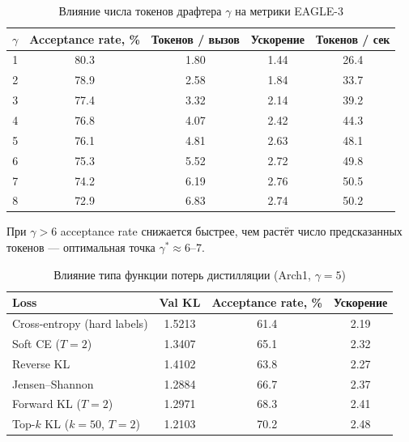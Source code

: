 \documentclass[12pt, a4paper]{article}
\begin{document}
\begin{table}[h]
\centering
\caption{Влияние числа токенов драфтера $\gamma$ на метрики EAGLE-3}
\label{tab:gamma_ablation}
\renewcommand{\arraystretch}{1.35}
\begin{tabular}{
  S[table-format=1]
  S[table-format=2.1]
  S[table-format=1.2]
  S[table-format=1.2]
  S[table-format=2.1]
}
\toprule
{$\gamma$} &
{\textbf{Acceptance rate, \%}} &
{\textbf{Токенов / вызов}} &
{\textbf{Ускорение}} &
{\textbf{Токенов / сек}} \\
  & 80.3 & 1.80 & 1.44 & 26.4 \\
2  & 78.9 & 2.58 & 1.84 & 33.7 \\
3  & 77.4 & 3.32 & 2.14 & 39.2 \\
4  & 76.8 & 4.07 & 2.42 & 44.3 \\
5  & 76.1 & 4.81 & 2.63 & 48.1 \\
6  & 75.3 & 5.52 & 2.72 & 49.8 \\
7  & 74.2 & 6.19 & 2.76 & 50.5 \\
8  & 72.9 & 6.83 & 2.74 & 50.2 \\
\bottomrule
\end{tabular}
\smallskip

\footnotesize
При $\gamma > 6$ acceptance rate снижается быстрее, чем растёт число предсказанных токенов —
оптимальная точка $\gamma^* \approx 6$--$7$.
\end{table}

\begin{table}[h]
\centering
\caption{Влияние типа функции потерь дистилляции (Arch1, $\gamma = 5$)}
\label{tab:loss_ablation}
\renewcommand{\arraystretch}{1.35}
\begin{tabular}{
  l
  S[table-format=1.4]
  S[table-format=2.1]
  S[table-format=1.2]
}
\toprule
\textbf{Loss} &
{\textbf{Val KL}} &
{\textbf{Acceptance rate, \%}} &
{\textbf{Ускорение}} \\
\midrule
Cross-entropy (hard labels)  & 1.5213 & 61.4 & 2.19 \\
Soft CE ($T=2$)              & 1.3407 & 65.1 & 2.32 \\
Reverse KL                   & 1.4102 & 63.8 & 2.27 \\
Jensen--Shannon              & 1.2884 & 66.7 & 2.37 \\
Forward KL ($T=2$)           & 1.2971 & 68.3 & 2.41 \\
Top-$k$ KL ($k=50$, $T=2$)  & 1.2103 & 70.2 & 2.48 \\
\bottomrule
\end{tabular}
\end{table}
\end{document}
